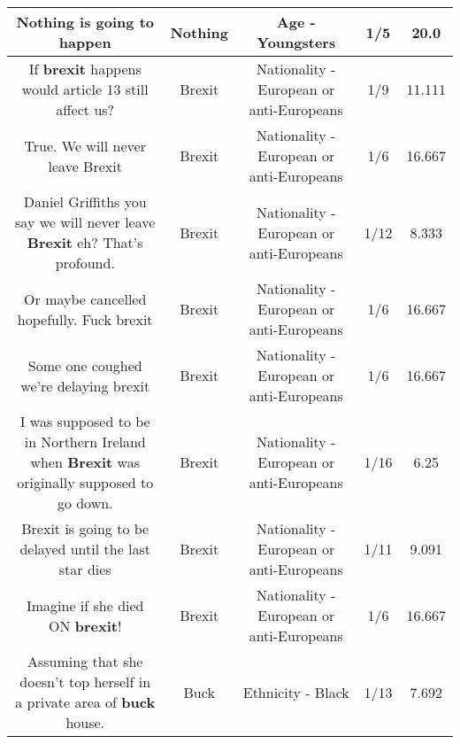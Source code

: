 \documentclass[11pt]{article}
\newlength\mylength
\begin{document}
\begin{center}
\begin{longtable}{|C{.65\mylength}|C{.30\mylength}|C{.12\mylength}|C{.12\mylength}|C{.12\mylength}|}
  \small Nothing is going to happen\normalsize   & Nothing & Age - Youngsters & 1/5 & 20.0 \\  \hline
  \small If \textbf{brexit} happens would article 13 still affect us?\normalsize   & Brexit & Nationality - European or anti-Europeans & 1/9 & 11.111 \\  \hline
  \small True. We will never leave Brexit\normalsize   & Brexit & Nationality - European or anti-Europeans & 1/6 & 16.667 \\  \hline
  \small Daniel Griffiths you say we will never leave \textbf{Brexit} eh? That's profound.\normalsize   & Brexit & Nationality - European or anti-Europeans & 1/12 & 8.333 \\  \hline
  \small Or maybe cancelled hopefully. Fuck brexit\normalsize   & Brexit & Nationality - European or anti-Europeans & 1/6 & 16.667 \\  \hline
  \small Some one coughed we're delaying brexit\normalsize   & Brexit & Nationality - European or anti-Europeans & 1/6 & 16.667 \\  \hline
  \small I was supposed to be in Northern Ireland when \textbf{Brexit} was originally supposed to go down.\normalsize   & Brexit & Nationality - European or anti-Europeans & 1/16 & 6.25 \\  \hline
  \small Brexit is going to be delayed until the last star dies\normalsize   & Brexit & Nationality - European or anti-Europeans & 1/11 & 9.091 \\  \hline
  \small Imagine if she died ON \textbf{brexit}!\normalsize   & Brexit & Nationality - European or anti-Europeans & 1/6 & 16.667 \\  \hline
  \small Assuming that she doesn't top herself in a private area of \textbf{buck} house.\normalsize   & Buck & Ethnicity - Black & 1/13 & 7.692 \\  \hline

\end{longtable}
\end{center}
\end{document}
